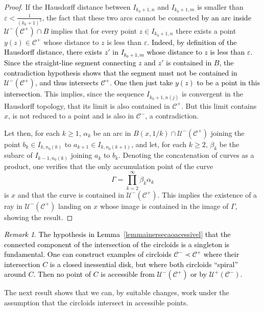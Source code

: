 \documentclass[12pt,a4paper]{amsart}
\theoremstyle{definition}
\theoremstyle{remark}
\newtheorem{obs}[thm]{Remark}
\begin{document}
\begin{proof}
If the Hausdorff distance between $I_{k_0+1,n}$ and $I_{k_0+1,m}$ is smaller than $\varepsilon<\frac{1}{(k_0+1)^{2}}$, the fact that these two arcs cannot be connected \textcolor{black}{by an arc inside $\mathcal{U}^{-}(\mathcal{C}^{+})\cap B$} implies that for every point $z\in I_{k_0+1,n}$ there exists a point $y(z)\in\mathcal{C}^{+}$ whose distance to $z$ is less than $\varepsilon$. \textcolor{black}{Indeed, by definition of the Hausdorff distance, there exists $z'$ in $I_{k_0+1,m}$ whose distance to $z$ is less than $\varepsilon$. Since the straight-line segment connecting $z$ and $z'$ is contained in $B$, the contradiction hypothesis shows that the segment must not be contained in $\mathcal{U}^-(\mathcal{C}^+)$, and thus intersects $\mathcal{C}^{+}$. One then just take $y(z)$ to be a point in this intersection}.  This implies, since the sequence $I_{k_0+1, n(j)}$ is convergent in the Hausdorff topology, that its limit is also contained in $\mathcal{C}^{+}$. But this limit contains $x$, is not reduced to a point and is also in $\mathcal{C}^-$, a contradiction.

Let then, for each $k\ge 1$, $\alpha_k$ be an arc in $B(x,1/k)\cap\mathcal{U}^{-}(\mathcal{C}^{+})$ joining the point $b_k\in I_{k,n_0(k)}$ to $a_{k+1}\in I_{k,n_0(k+1)}$, and let, for each $k\ge 2$, $\beta_k$ be the subarc of $I_{k-1,n_0(k)}$ joining $a_k$ to $b_k$. Denoting the concatenation of curves as a product, one verifies that the only accumulation point of the curve $$\Gamma=\prod_{k=2}^{\infty}\beta_k\alpha_k$$ is $x$ and that the curve is contained in $\mathcal{U}^-(\mathcal{C}^{+})$. This implies the existence of a ray in $\mathcal{U}^-(\mathcal{C}^{+})$ landing on $x$ whose image is contained in the image of $\Gamma$, showing the result. 
\end{proof}

\textcolor{black}{
\begin{obs}
The hypothesis in Lemma~\ref{lemmainersecaoacessivel} that the connected component of the intersection of the circloids is a singleton is fundamental. One can construct examples of circloids $\mathcal{C}^-\prec\mathcal{C}^+$ where their intersection $C$ is a closed inessential disk, but where both circloids ``spiral'' around $C$. Then no point of $C$ is  accessible from $\mathcal{U}^{-}(\mathcal{C}^{+})$ or by $\mathcal{U}^{+}(\mathcal{C}^{-})$. 
\end{obs}
}

The next result shows that we can, by suitable changes, work under the assumption that the circloids intersect in accessible points.
\end{document}
